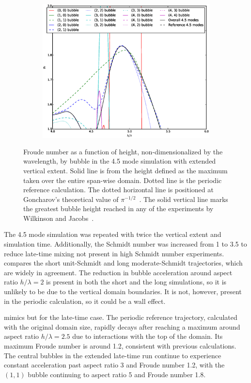 \begin{figure}
\begin{subfigure}[b]{0.32\textwidth}
\end{subfigure}
\begin{subfigure}[b]{0.32\textwidth}
  \includegraphics[width=\textwidth]{plts/Fr_long_walls_zoom2}
\end{subfigure}
\caption{ 
Froude number as a function of height, non-dimensionalized by the wavelength, by bubble in the 4.5 mode simulation with extended vertical extent.
Solid line is from the height defined as the maximum taken over the entire span-wise domain.
Dotted line is the periodic reference calculation.
The dotted horizontal line is positioned at Goncharov's theoretical value of $\pi^{-1/2}$~\cite{Goncharov2002}.
The solid vertical line marks the greatest bubble height reached in any of the experiments by Wilkinson and Jacobs~\cite{Wilkinson2007}.
}
\end{figure}


The 4.5 mode simulation was repeated with twice the vertical extent and simulation time.
Additionally, the Schmidt number was increased from 1 to 3.5 to reduce late-time mixing not present in high Schmidt number experiments.
 compares the short unit-Schmidt and long moderate-Schmidt trajectories, which are widely in agreement.
The reduction in bubble acceleration around aspect ratio $h/\lambda = 2$ is present in both the short and the long simulations, so it is unlikely to be due to the vertical domain boundaries.
It is not, however, present in the periodic calculation, so it could be a wall effect.

 mimics  but for the late-time case.
The periodic reference trajectory, calculated with the original domain size, rapidly decays after reaching a maximum around aspect ratio $h/\lambda = 2.5$ due to interactions with the top of the domain.
Its maximum Froude number is around 1.2, consistent with previous calculations.
The central bubbles in the extended late-time run continue to experience constant acceleration past aspect ratio 3 and Froude number 1.2, with the $(1,1)$ bubble continuing to aspect ratio 5 and Froude number 1.8.

